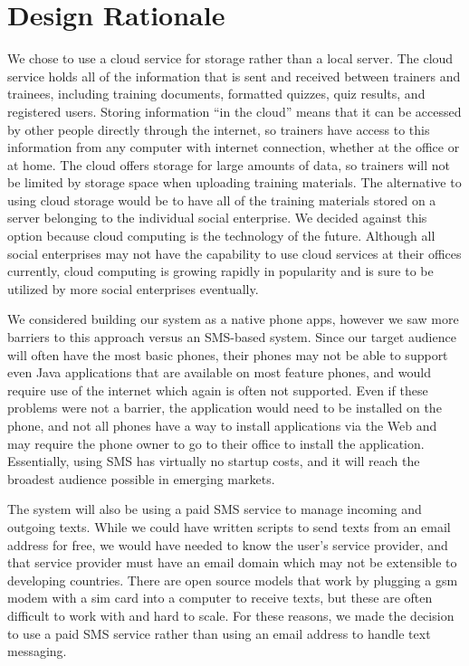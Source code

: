 \section{Design Rationale}

We chose to use a cloud service for storage rather than a local server. The cloud service holds all of the information that is sent and received between trainers and trainees, including training documents, formatted quizzes, quiz results, and registered users. Storing information “in the cloud” means that it can be accessed by other people directly through the internet, so trainers have access to this information from any computer with internet connection, whether at the office or at home. The cloud offers storage for large amounts of data, so trainers will not be limited by storage space when uploading training materials. The alternative to using cloud storage would be to have all of the training materials stored on a server belonging to the individual social enterprise. We decided against this option because cloud computing is the technology of the future. Although all social enterprises may not have the capability to use cloud services at their offices currently, cloud computing is growing rapidly in popularity and is sure to be utilized by more social enterprises eventually.

We considered building our system as a native phone apps, however we saw more barriers to this approach versus an SMS-based system. Since our target audience will often have the most basic phones, their phones may not be able to support even Java applications that are available on most feature phones, and would require use of the internet which again is often not supported. Even if these problems were not a barrier, the application would need to be installed on the phone, and not all phones have a way to install applications via the Web and may require the phone owner to go to their office to install the application. Essentially, using SMS has virtually no startup costs, and it will reach the broadest audience possible in emerging markets.

The system will also be using a paid SMS service to manage incoming and outgoing texts. While we could have written scripts to send texts from an email address for free, we would have needed to know the user’s service provider, and that service provider must have an email domain which may not be extensible to developing countries. There are open source models that work by plugging a gsm modem with a sim card into a computer to receive texts, but these are often difficult to work with and hard to scale. For these reasons, we made the decision to use a paid SMS service rather than using an email address to handle text messaging.
